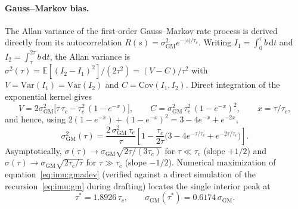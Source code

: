 \paragraph{Gauss--Markov bias.} The Allan variance of the first-order
Gauss--Markov rate process is derived directly from its autocorrelation
$R(s) = \sigma_{\mathrm{GM}}^2 e^{-|s|/\tau_c}$. Writing $I_1 =
\int_0^\tau b\,\mathrm{d}t$ and $I_2 = \int_\tau^{2\tau}
b\,\mathrm{d}t$, the Allan variance is $\sigma^2(\tau) =
\mathbb{E}[(I_2 - I_1)^2]/(2\tau^2) = (V - C)/\tau^2$ with $V =
\mathrm{Var}(I_1) = \mathrm{Var}(I_2)$ and $C = \mathrm{Cov}(I_1, I_2)$.
Direct integration of the exponential kernel gives
\begin{equation}
  V = 2\sigma_{\mathrm{GM}}^2\bigl[\tau\,\tau_c
      - \tau_c^2\,(1 - e^{-x})\bigr],
  \qquad
  C = \sigma_{\mathrm{GM}}^2\,\tau_c^2\,(1 - e^{-x})^2,
  \qquad
  x = \tau/\tau_c ,
  \label{eq:imu:gmvc}
\end{equation}
and hence, using $2(1-e^{-x}) + (1-e^{-x})^2 = 3 - 4e^{-x} + e^{-2x}$,
\begin{equation}
  \boxed{\;
  \sigma_{\mathrm{GM}}^2(\tau)
    = \frac{2\,\sigma_{\mathrm{GM}}^2\,\tau_c}{\tau}
      \left[ 1 - \frac{\tau_c}{2\tau}
        \bigl( 3 - 4e^{-\tau/\tau_c} + e^{-2\tau/\tau_c} \bigr)
      \right].
  \;}
  \label{eq:imu:gmadev}
\end{equation}
Asymptotically, $\sigma(\tau) \to \sigma_{\mathrm{GM}}
\sqrt{2\tau/(3\tau_c)}$ for $\tau \ll \tau_c$ (slope $+1/2$) and
$\sigma(\tau) \to \sigma_{\mathrm{GM}} \sqrt{2\tau_c/\tau}$ for $\tau \gg
\tau_c$ (slope $-1/2$). Numerical maximization of
equation~\eqref{eq:imu:gmadev} (verified against a direct simulation of
the recursion~\eqref{eq:imu:gm} during drafting) locates the single
interior peak at
\begin{equation}
  \tau^{*} = 1.8926\,\tau_c,
  \qquad
  \sigma_{\mathrm{GM}}(\tau^{*}) = 0.6174\,\sigma_{\mathrm{GM}} .
  \label{eq:imu:gmpeak}
\end{equation}

